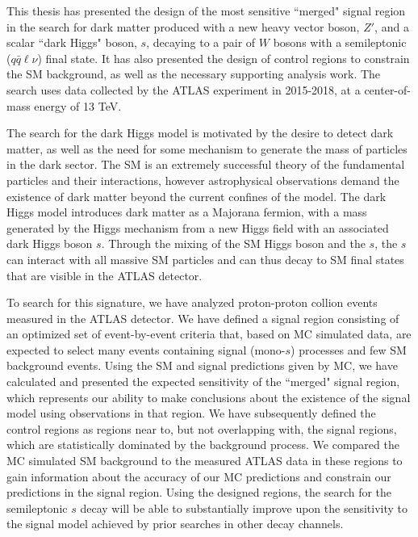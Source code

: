\label{concl}
This thesis has presented the design of the most sensitive ``merged" signal region in the search for dark matter produced with a new heavy vector boson, $Z'$, and a scalar ``dark Higgs" boson, $s$, decaying to a pair of $W$ bosons with a semileptonic ($q\bar{q}\ell\nu$) final state. It has also presented the design of control regions to constrain the \ttbar SM background, as well as the necessary supporting analysis work.  The search uses data collected by the ATLAS experiment in 2015-2018, at a center-of-mass energy of 13 TeV.

The search for the dark Higgs model is motivated by the desire to detect dark matter, as well as the need for some mechanism to generate the mass of particles in the dark sector. The SM is an extremely successful theory of the fundamental particles and their interactions, however astrophysical observations demand the existence of dark matter beyond the current confines of the model. The dark Higgs model introduces dark matter as a Majorana fermion, with a mass generated by the Higgs mechanism from a new Higgs field with an associated dark Higgs boson $s$. Through the mixing of the SM Higgs boson and the $s$, the $s$ can interact with all massive SM particles and can thus decay to SM final states that are visible in the ATLAS detector.

To search for this signature, we have analyzed proton-proton collion events measured in the ATLAS detector. We have defined a signal region consisting of an optimized set of event-by-event criteria that, based on MC simulated data, are expected to select many events containing signal (mono-$s$) processes and few SM background events. Using the SM and signal predictions given by MC, we have calculated and presented the expected sensitivity of the ``merged" signal region, which represents our ability to make conclusions about the existence of the signal model using observations in that region. We have subsequently defined the control regions as regions near to, but not overlapping with, the signal regions, which are statistically dominated by the \ttbar background process. We compared the MC simulated SM background to the measured ATLAS data in these regions to gain information about the accuracy of our MC predictions and constrain our predictions in the signal region. Using the designed regions, the search for the semileptonic $s$ decay will be able to substantially improve upon the sensitivity to the signal model achieved by prior searches in other decay channels.
